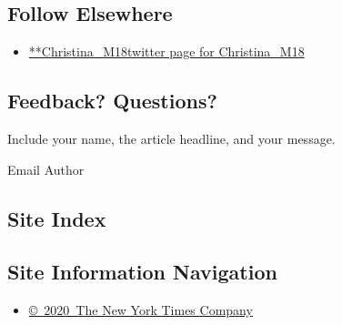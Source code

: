 \hypertarget{follow-elsewhere}{%
\subsection{Follow Elsewhere}\label{follow-elsewhere}}

\begin{itemize}
\tightlist
\item
  \href{https://twitter.com/Christina_M18}{**Christina\_M18twitter page
  for Christina\_M18}
\end{itemize}

\hypertarget{feedback-questions}{%
\subsection{Feedback? Questions?}\label{feedback-questions}}

Include your name, the article headline, and your message.

Email Author

\hypertarget{site-index}{%
\subsection{Site Index}\label{site-index}}

\hypertarget{site-information-navigation}{%
\subsection{Site Information
Navigation}\label{site-information-navigation}}

\begin{itemize}
\tightlist
\item
  \href{https://help.nytimes.com/hc/en-us/articles/115014792127-Copyright-notice}{©~2020~The
  New York Times Company}
\end{itemize}

